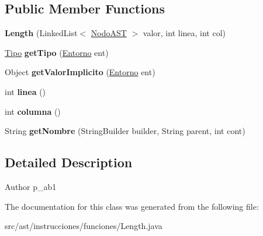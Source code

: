 \subsection*{Public Member Functions}
\begin{DoxyCompactItemize}
\item 
\mbox{\label{classast_1_1instrucciones_1_1funciones_1_1_length_aa2acc25f4924ede4aa6b2d315496baae}} 
{\bfseries Length} (Linked\+List$<$ \mbox{\hyperlink{interfaceast_1_1_nodo_a_s_t}{Nodo\+A\+ST}} $>$ valor, int linea, int col)
\item 
\mbox{\label{classast_1_1instrucciones_1_1funciones_1_1_length_ac0d711d436782df361d1ac85f91bf7fd}} 
\mbox{\hyperlink{classentorno_1_1_tipo}{Tipo}} {\bfseries get\+Tipo} (\mbox{\hyperlink{classentorno_1_1_entorno}{Entorno}} ent)
\item 
\mbox{\label{classast_1_1instrucciones_1_1funciones_1_1_length_a406a8ee9778dd07d054d65ee8e044a5f}} 
Object {\bfseries get\+Valor\+Implicito} (\mbox{\hyperlink{classentorno_1_1_entorno}{Entorno}} ent)
\item 
\mbox{\label{classast_1_1instrucciones_1_1funciones_1_1_length_a46fb440694a43e3a53464c28c4ff9e4b}} 
int {\bfseries linea} ()
\item 
\mbox{\label{classast_1_1instrucciones_1_1funciones_1_1_length_a8a9597fd6ea4786aeefba4976a8b62e7}} 
int {\bfseries columna} ()
\item 
\mbox{\label{classast_1_1instrucciones_1_1funciones_1_1_length_a5ac2bc119702f390692eb86307e04b4e}} 
String {\bfseries get\+Nombre} (String\+Builder builder, String parent, int cont)
\end{DoxyCompactItemize}


\subsection{Detailed Description}
\begin{DoxyAuthor}{Author}
p\+\_\+ab1 
\end{DoxyAuthor}


The documentation for this class was generated from the following file\+:\begin{DoxyCompactItemize}
\item 
src/ast/instrucciones/funciones/Length.\+java\end{DoxyCompactItemize}

